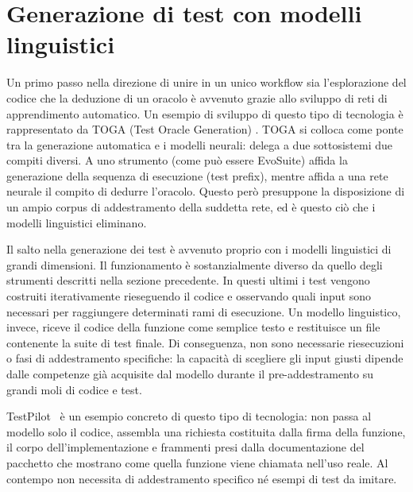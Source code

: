 \section{Generazione di test con modelli linguistici}
Un primo passo nella direzione di unire in un unico workflow sia l'esplorazione del codice che la deduzione di un oracolo è avvenuto grazie allo sviluppo di reti di apprendimento automatico. Un esempio di sviluppo di questo tipo di tecnologia è rappresentato da TOGA (Test Oracle Generation) \cite{dinella2022toga}. TOGA si colloca come ponte tra la generazione automatica e i modelli neurali: delega a due sottosistemi due compiti diversi. A uno strumento (come può essere EvoSuite) affida la generazione della sequenza di esecuzione (test prefix), mentre affida a una rete neurale il compito di dedurre l'oracolo. Questo però presuppone la disposizione di un ampio corpus di addestramento della suddetta rete, ed è questo ciò che i modelli linguistici eliminano.

Il salto nella generazione dei test è avvenuto proprio con i modelli linguistici di grandi dimensioni. Il funzionamento è sostanzialmente diverso da quello degli strumenti descritti nella sezione precedente. In questi ultimi i test vengono costruiti iterativamente rieseguendo il codice e osservando quali input sono necessari per raggiungere determinati rami di esecuzione. Un modello linguistico, invece, riceve il codice della funzione come semplice testo e restituisce un file contenente la suite di test finale. Di conseguenza, non sono necessarie riesecuzioni o fasi di addestramento specifiche: la capacità di scegliere gli input giusti dipende dalle competenze già acquisite dal modello durante il pre-addestramento su grandi moli di codice e test.

TestPilot~\cite{schaefer2024testpilot} è un esempio concreto di questo tipo di tecnologia: non passa al modello solo il codice, assembla una richiesta costituita dalla firma della funzione, il corpo dell'implementazione e frammenti presi dalla documentazione del pacchetto che mostrano come quella funzione viene chiamata nell'uso reale. Al contempo non necessita di addestramento specifico né esempi di test da imitare.

